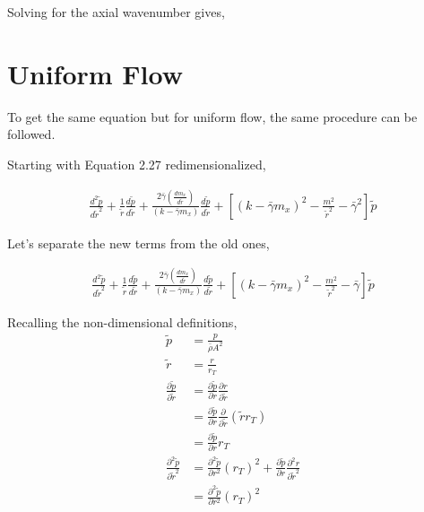 Solving for the axial wavenumber gives,
\section{Uniform Flow}

To get the same equation but for uniform flow, the same procedure can be followed.

Starting with Equation 2.27 redimensionalized, 

\begin{align*}
    \frac{ d^2 \tilde{p}}{d \tilde{r}^2} +
    \frac{1}{\tilde{r}} 
    \frac{d \tilde{p}}{d \tilde{r}} + 
    \frac{2 \bar{\gamma} \left( \frac{d m_x}{d \tilde{r}} \right)}
    {\left( k - \bar{\gamma} m_x \right)}\frac{d \tilde{p}}{d \tilde{r}}+
    \left[ \left( k - \bar{\gamma} m_x \right)^2 - \frac{m^2}{\tilde{r}^2}- 
    \bar{\gamma}^2 \right] \tilde{p}
\end{align*}

Let's separate the new terms from the old ones, 

\begin{align*}
    \frac{ d^2 \tilde{p}}{d \tilde{r}^2} +
    \frac{1}{\tilde{r}} 
    \frac{d \tilde{p}}{d \tilde{r}} + 
    \frac{2 \bar{\gamma} \left( \frac{d m_x}{d \tilde{r}} \right)}
    {\left( k - \bar{\gamma} m_x \right)}\frac{d \tilde{p}}{d \tilde{r}}+
    \left[ \left( k - \bar{\gamma} m_x \right)^2 - \frac{m^2}{\tilde{r}^2}- 
    \bar{\gamma} \right] \tilde{p}
\end{align*}


Recalling the non-dimensional definitions,
\begin{align*}
    \tilde{p} &= \frac{p}{\bar{\rho} A^2} \\
    \tilde{r} &= \frac{r}{r_T} \\
    \frac{\partial \tilde{p}}{\partial \tilde{r}} &= 
    \frac{ \partial \tilde{p}}{\partial r} \frac{\partial r}{ \partial \tilde{r}}  \\ 
    &= \frac{ \partial \tilde{p}}{\partial r} \frac{\partial }{ \partial \tilde{r}} \left( \tilde{r} r_T \right) \\
    &= 
    \frac{ \partial \tilde{p}}{\partial r}  r_T \\
    \frac{\partial^2 \tilde{p}}{\partial \tilde{r}^2} &= 
    \frac{ \partial^2 \tilde{p}}{\partial r^2}  (r_T)^2+ 
    \frac{ \partial \tilde{p}}{\partial r} \frac{\partial^2 r}{ \partial \tilde{r}^2} \\
    &= \frac{ \partial^2 \tilde{p}}{\partial r^2}  (r_T)^2 
\end{align*}

